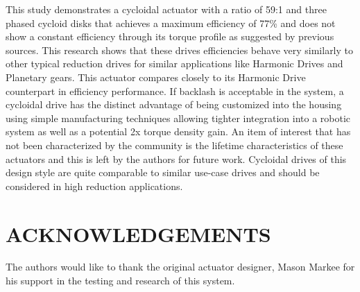 \documentclass[letterpaper, 10 pt, conference]{ieeeconf}  %
\begin{document}
This study demonstrates a cycloidal actuator with a ratio of 59:1 and three phased cycloid disks that achieves a maximum efficiency of 77\% and does not show a constant efficiency through its torque profile as suggested by previous sources. This research shows that these drives efficiencies behave very similarly to other typical reduction drives for similar applications like Harmonic Drives and Planetary gears. This actuator compares closely to its Harmonic Drive counterpart in efficiency performance. If backlash is acceptable in the system, a cycloidal drive has the distinct advantage of being customized into the housing using simple manufacturing techniques allowing tighter integration into a robotic system as well as a potential 2x torque density gain. An item of interest that has not been characterized by the community is the lifetime characteristics of these actuators and this is left by the authors for future work. Cycloidal drives of this design style are quite comparable to similar use-case drives and should be considered in high reduction applications.

\section{ACKNOWLEDGEMENTS}

The authors would like to thank the original actuator designer, Mason Markee for his support in the testing and research of this system.  

\addtolength{\textheight}{-12cm}   %








\end{document}
